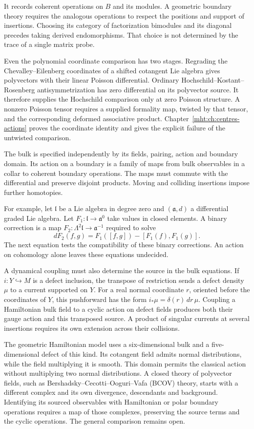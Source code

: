 It records coherent operations on $B$ and its modules. A geometric
boundary theory requires the analogous operations to respect the
positions and support of insertions. Choosing its category of
factorization bimodules and its diagonal precedes taking derived
endomorphisms. That choice is not determined by the trace of a single
matrix probe.

Even the polynomial coordinate comparison has two stages. Regrading
the Chevalley--Eilenberg coordinates of a shifted cotangent Lie algebra
gives polyvectors with their linear Poisson differential. Ordinary
Hochschild--Kostant--Rosenberg antisymmetrization has zero differential
on its polyvector source. It therefore supplies the Hochschild
comparison only at zero Poisson structure. A nonzero Poisson tensor
requires a supplied formality map, twisted by that tensor, and the
corresponding deformed associative product.
Chapter~\ref{mht:ch:centres-actions} proves the coordinate identity
and gives the explicit failure of the untwisted comparison.

The bulk is specified independently by its fields, pairing, action
and boundary domain. Its action on a boundary is a family of maps
from bulk observables in a collar to coherent boundary operations.
The maps must commute with the differential and preserve disjoint
products. Moving and colliding insertions impose further homotopies.

For example, let $\mathfrak l$ be a Lie algebra in degree zero and
$(\mathfrak a,d)$ a differential graded Lie algebra.
Let $F_1:\mathfrak l\to\mathfrak a^0$ take values in closed elements.
A binary correction is a map
$F_2:\Lambda^2\mathfrak l\to\mathfrak a^{-1}$ required to solve
\[
 dF_2(f,g)=F_1([f,g])-[F_1(f),F_1(g)].
\]
The next equation tests the compatibility of these binary corrections.
An action on cohomology alone leaves these equations undecided.

A dynamical coupling must also determine the source in the bulk
equations. If $i:Y\hookrightarrow M$ is a defect inclusion, the
transpose of restriction sends a defect density $\mu$ to a current
supported on $Y$. For a real normal coordinate $r$, oriented before
the coordinates of $Y$, this pushforward has the form
$i_*\mu=\delta(r)\,dr\,\mu$. Coupling a Hamiltonian bulk field to a
cyclic action on defect fields produces both their gauge action and
this transposed source. A product of singular currents at several
insertions requires its own extension across their collisions.

The geometric Hamiltonian model uses a six-dimensional bulk and a
five-dimensional defect of this kind. Its cotangent field admits
normal distributions, while the field multiplying it is smooth.
This domain permits the classical action without multiplying two
normal distributions. A closed theory of polyvector fields, such as
Bershadsky--Cecotti--Ooguri--Vafa (BCOV) theory, starts with a different
complex and its own divergence, descendants and background.
Identifying its sourced observables with Hamiltonian or polar boundary
operations requires a map of those complexes, preserving the source
terms and the cyclic operations. The general comparison remains open.


